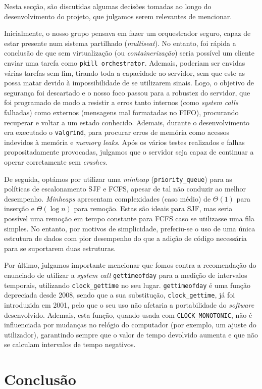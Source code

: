 \documentclass[11pt]{article}
\begin{document}
Nesta secção, são discutidas algumas decisões tomadas ao longo do desenvolvimento do projeto, que
julgamos serem relevantes de mencionar.

Inicialmente, o nosso grupo pensava em fazer um orquestrador seguro, capaz de estar presente num
sistema partilhado (\emph{multiseat}). No entanto, foi rápida a conclusão de que sem virtualização
(ou \emph{containerização}) seria possível um cliente enviar uma tarefa como \texttt{pkill
orchestrator}. Ademais, poderiam ser envidas várias tarefas sem fim, tirando toda a capacidade ao
servidor, sem que este as possa matar devido à impossibilidade de se utilizarem sinais. Logo, o
objetivo de segurança foi descartado e o nosso foco passou para a robustez do servidor, que foi
programado de modo a resistir a erros tanto internos (como \emph{system calls} falhadas) como
externos (mensagens mal formatadas no FIFO), procurando recuperar e voltar a um estado conhecido.
Ademais, durante o desenvolvimento era executado o \texttt{valgrind}, para procurar erros de memória
como acessos indevidos à memória e \emph{memory leaks}. Após os vários testes realizados e falhas
propositadamente provocadas, julgamos que o servidor seja capaz de continuar a operar corretamente
sem \emph{crashes}.

De seguida, optámos por utilizar uma \emph{minheap} (\texttt{priority\_queue}) para as políticas de
escalonamento SJF e FCFS, apesar de tal não conduzir ao melhor desempenho. \emph{Minheaps}
apresentam complexidades (caso médio) de $\Theta(1)$ para inserção e $\Theta(\log n)$ para remoção.
Estas são ideais para SJF, mas seria possível uma remoção em tempo constante para FCFS caso se
utilizasse uma fila simples. No entanto, por motivos de simplicidade, preferiu-se o uso de uma única
estrutura de dados com pior desempenho do que a adição de código necessária para se suportarem duas
estruturas.

Por último, julgamos importante mencionar que fomos contra a recomendação do enunciado de utilizar a
\emph{system call} \texttt{gettimeofday} para a medição de intervalos temporais, utilizando
\texttt{clock\_gettime} no seu lugar. \texttt{gettimeofday} é uma função depreciada desde 2008,
sendo que a sua substitução, \texttt{clock\_gettime}, já foi introduzida em 2001, pelo que o seu uso
não afetaria a portabilidade do \emph{software} desenvolvido. Ademais, esta função, quando usada com
\texttt{CLOCK\_MONOTONIC}, não é influenciada por mudanças no relógio do computador (por exemplo,
um ajuste do utilizador), garantindo sempre que o valor de tempo devolvido aumenta e que não se
calculam intervalos de tempo negativos.

\section{Conclusão}

\end{document}
